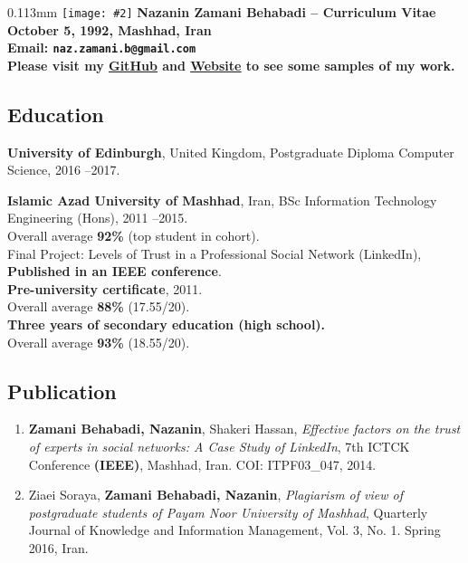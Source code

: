 \documentclass[10pt]{article}
\newcommand{\imagetext}[3][0.11]{%
\begin{imagetextbox}[]{#1\textwidth}{3mm}%
  \texttt{[image: \#2]}%
  \tcblower%
   #3%
\end{imagetextbox}}
\begin{document}
\imagetext{1.jpg}{\Large\bf Nazanin Zamani Behabadi -- \textcolor{ green!50!red}{Curriculum Vitae} \\ \normalsize October 5, 1992, Mashhad, Iran \\ \normalsize Email: \texttt{naz.zamani.b@gmail.com}\\ \small{Please visit my \href{https://github.com/Nazzamani}{\underline{GitHub}} and \href{https://nazzamani.github.io}{\underline{Website}} to see some samples of my work.}}
\thispagestyle{empty}

\subsection*{Education}
\noindent \textbf{University of Edinburgh}, United Kingdom, Postgraduate Diploma Computer Science, 2016 --2017.

\noindent \textbf{Islamic Azad University of Mashhad}, Iran, BSc Information Technology Engineering (Hons), 2011 --2015. \\
\indent Overall average \textbf{92\%} (top student in cohort).\\
\indent Final Project: Levels of Trust in a Professional Social Network (LinkedIn), \textbf {Published in an IEEE conference}.\\
\noindent \textbf{Pre-university certificate}, 2011.\\
 \indent Overall average  \textbf{88\%}  (17.55/20).\\
\noindent \textbf{ Three years of secondary education (high school).}\\
\indent Overall average  \textbf{93\%}  (18.55/20).
\subsection*{Publication}
\begin{enumerate}
\item \textbf{Zamani Behabadi, Nazanin}, Shakeri Hassan, \textit{Effective factors on the trust of experts in social networks: A Case Study of LinkedIn}, 7th ICTCK Conference\textbf{ (IEEE)}, Mashhad, Iran. COI:  ITPF03\_047, 2014.
\item Ziaei Soraya, \textbf{Zamani Behabadi, Nazanin}, \textit{Plagiarism of view of postgraduate students of Payam Noor University of Mashhad}, Quarterly Journal of Knowledge and Information Management, Vol. 3, No. 1. Spring 2016, Iran.
\end{enumerate}
\end{document}
